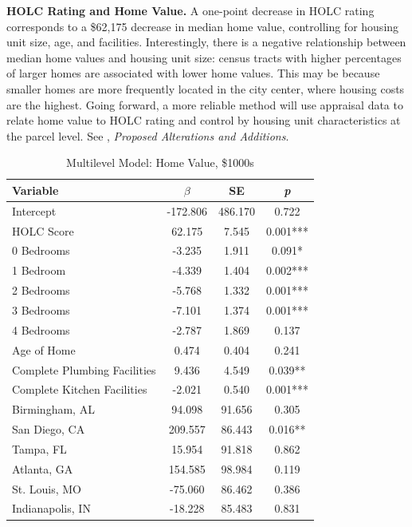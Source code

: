 \documentclass[paper=letter, fontsize=12pt]{scrartcl} %
\begin{document}
	\begin{table}
		\textbf{HOLC Rating and Home Value.} A one-point decrease in HOLC rating corresponds to a \$62,175 decrease in median home value, controlling for housing unit size, age, and facilities. Interestingly, there is a negative relationship between median home values and housing unit size: census tracts with higher percentages of larger homes are associated with lower home values. This may be because smaller homes are more frequently located in the city center, where housing costs are the highest. Going forward, a more reliable method will use appraisal data to relate home value to HOLC rating and control by housing unit characteristics at the parcel level. See , \textit{Proposed Alterations and Additions}.
		\caption{Multilevel Model: Home Value, \$1000s}
		\begin{center}
			\begin{tabular}{|| l | c c c ||}
				\hline
				Variable & $\beta$ & SE & \textit{p} \\
				\hline \hline
				Intercept & -172.806 & 486.170 & 0.722 \\
				\hline
				HOLC Score & 62.175 & 7.545 & 0.001*** \\
				\hline
				0 Bedrooms & -3.235 & 1.911 & 0.091* \\
				\hline
				1 Bedroom & -4.339 & 1.404 & 0.002*** \\
				\hline
				2 Bedrooms & -5.768 & 1.332 & 0.001*** \\
				\hline
				3 Bedrooms & -7.101 & 1.374 & 0.001*** \\
				\hline
				4 Bedrooms & -2.787 & 1.869 & 0.137 \\
				\hline
				Age of Home & 0.474 & 0.404 & 0.241 \\
				\hline
				Complete Plumbing Facilities & 9.436 & 4.549 & 0.039** \\
				\hline
				Complete Kitchen Facilities & -2.021 & 0.540 & 0.001*** \\
				\hline
				Birmingham, AL & 94.098 & 91.656 & 0.305 \\
				\hline
				San Diego, CA & 209.557 & 86.443 & 0.016** \\
				\hline
				Tampa, FL & 15.954 & 91.818 & 0.862 \\
				\hline
				Atlanta, GA & 154.585 & 98.984 & 0.119 \\
				\hline
				St. Louis, MO & -75.060 & 86.462 & 0.386 \\
				\hline
				Indianapolis, IN & -18.228 & 85.483 & 0.831 \\

\end{tabular}
\end{center}
\end{table}
\end{document}

